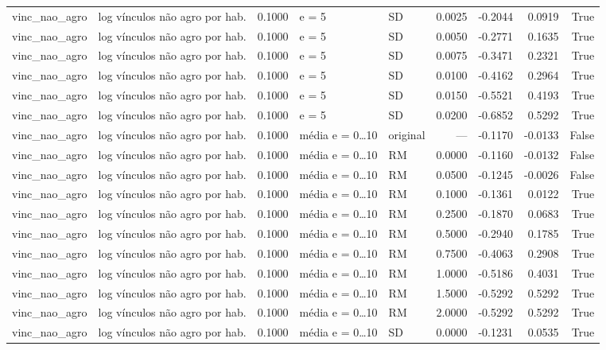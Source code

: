 \begin{table}
{\begin{tabular}{llrllrrrr}
vinc\_nao\_agro & log vínculos não agro por hab. & 0.1000 & e = 5 & SD & 0.0025 & -0.2044 & 0.0919 & True \\
vinc\_nao\_agro & log vínculos não agro por hab. & 0.1000 & e = 5 & SD & 0.0050 & -0.2771 & 0.1635 & True \\
vinc\_nao\_agro & log vínculos não agro por hab. & 0.1000 & e = 5 & SD & 0.0075 & -0.3471 & 0.2321 & True \\
vinc\_nao\_agro & log vínculos não agro por hab. & 0.1000 & e = 5 & SD & 0.0100 & -0.4162 & 0.2964 & True \\
vinc\_nao\_agro & log vínculos não agro por hab. & 0.1000 & e = 5 & SD & 0.0150 & -0.5521 & 0.4193 & True \\
vinc\_nao\_agro & log vínculos não agro por hab. & 0.1000 & e = 5 & SD & 0.0200 & -0.6852 & 0.5292 & True \\
vinc\_nao\_agro & log vínculos não agro por hab. & 0.1000 & média e = 0…10 & original & — & -0.1170 & -0.0133 & False \\
vinc\_nao\_agro & log vínculos não agro por hab. & 0.1000 & média e = 0…10 & RM & 0.0000 & -0.1160 & -0.0132 & False \\
vinc\_nao\_agro & log vínculos não agro por hab. & 0.1000 & média e = 0…10 & RM & 0.0500 & -0.1245 & -0.0026 & False \\
vinc\_nao\_agro & log vínculos não agro por hab. & 0.1000 & média e = 0…10 & RM & 0.1000 & -0.1361 & 0.0122 & True \\
vinc\_nao\_agro & log vínculos não agro por hab. & 0.1000 & média e = 0…10 & RM & 0.2500 & -0.1870 & 0.0683 & True \\
vinc\_nao\_agro & log vínculos não agro por hab. & 0.1000 & média e = 0…10 & RM & 0.5000 & -0.2940 & 0.1785 & True \\
vinc\_nao\_agro & log vínculos não agro por hab. & 0.1000 & média e = 0…10 & RM & 0.7500 & -0.4063 & 0.2908 & True \\
vinc\_nao\_agro & log vínculos não agro por hab. & 0.1000 & média e = 0…10 & RM & 1.0000 & -0.5186 & 0.4031 & True \\
vinc\_nao\_agro & log vínculos não agro por hab. & 0.1000 & média e = 0…10 & RM & 1.5000 & -0.5292 & 0.5292 & True \\
vinc\_nao\_agro & log vínculos não agro por hab. & 0.1000 & média e = 0…10 & RM & 2.0000 & -0.5292 & 0.5292 & True \\
vinc\_nao\_agro & log vínculos não agro por hab. & 0.1000 & média e = 0…10 & SD & 0.0000 & -0.1231 & 0.0535 & True \\

\end{tabular}}
\end{table}
